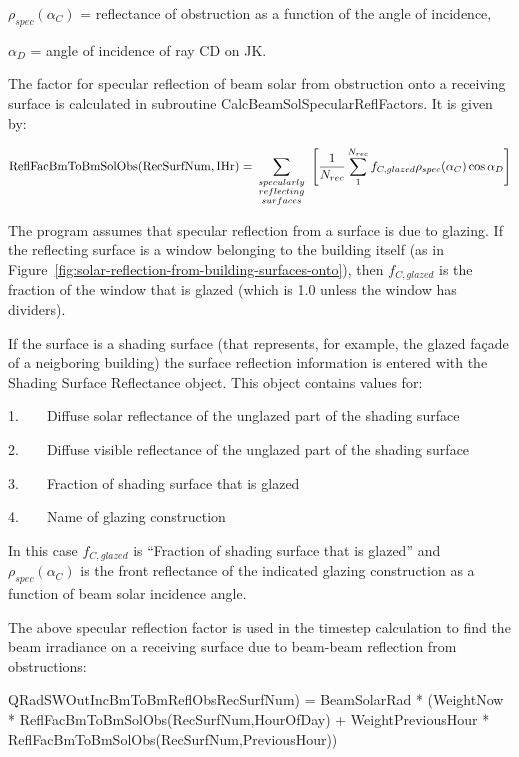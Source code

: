 \({\rho_{spec}}({\alpha_C})\) = reflectance of obstruction as a function of the angle of incidence,

\({\alpha_D}\) = angle of incidence of ray CD on JK.

The factor for specular reflection of beam solar from obstruction onto a receiving surface is calculated in subroutine CalcBeamSolSpecularReflFactors. It is given by:

\begin{equation}
{\rm{ReflFacBmToBmSolObs(RecSurfNum,IHr) }} = \sum\limits_{\scriptstyle specularly\atop{\scriptstyle reflecting\atop\scriptstyle surfaces}} {} \left[ {\frac{1}{{{N_{rec}}}}\sum\limits_1^{{N_{rec}}} {{f_{C,glazed}}{\rho_{spec}}({\alpha_C})\cos {\alpha_D}} } \right]
\end{equation}

The program assumes that specular reflection from a surface is due to glazing. If the reflecting surface is a window belonging to the building itself (as in Figure~\ref{fig:solar-reflection-from-building-surfaces-onto}), then \({f_{C,glazed}}\) is the fraction of the window that is glazed (which is 1.0 unless the window has dividers).

If the surface is a shading surface (that represents, for example, the glazed façade of a neigboring building) the surface reflection information is entered with the Shading Surface Reflectance object. This object contains values for:

1.~~~~Diffuse solar reflectance of the unglazed part of the shading surface

2.~~~~Diffuse visible reflectance of the unglazed part of the shading surface

3.~~~~Fraction of shading surface that is glazed

4.~~~~Name of glazing construction

In this case \({f_{C,glazed}}\) is ``Fraction of shading surface that is glazed'' and \({\rho_{spec}}({\alpha_C})\) is the front reflectance of the indicated glazing construction as a function of beam solar incidence angle.

The above specular reflection factor is used in the timestep calculation to find the beam irradiance on a receiving surface due to beam-beam reflection from obstructions:

QRadSWOutIncBmToBmReflObsRecSurfNum) = BeamSolarRad * (WeightNow * ReflFacBmToBmSolObs(RecSurfNum,HourOfDay) + WeightPreviousHour * ReflFacBmToBmSolObs(RecSurfNum,PreviousHour))
